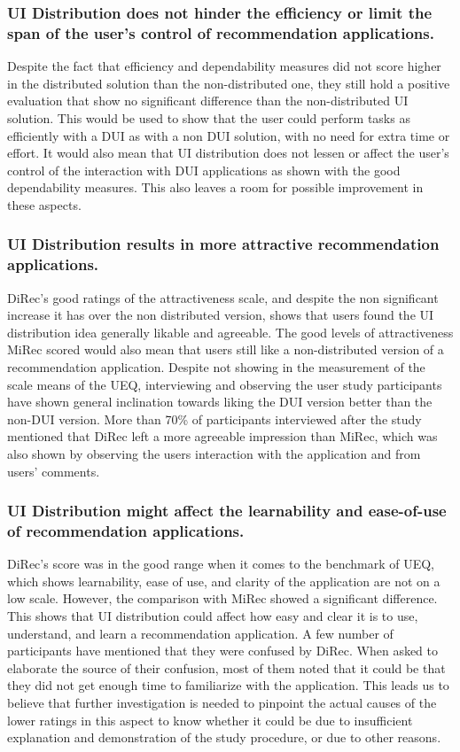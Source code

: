 \subsubsection{UI Distribution does not hinder the efficiency or limit the span
of the user's control of recommendation applications.} Despite the fact that
efficiency and dependability measures did not score higher in the distributed
solution than the non-distributed one, they still hold a positive
evaluation that show no significant difference than the non-distributed UI
solution. This would be used to show that the user could perform tasks as
efficiently with a DUI as with a non DUI solution, with no need for extra time
or effort. It would also mean that UI distribution does not lessen or affect the
user's control of the interaction with DUI applications as shown with the good
dependability measures. This also leaves a room for possible improvement in
these aspects.

\subsubsection{UI Distribution results in more attractive recommendation applications.} DiRec's good ratings of the attractiveness scale, and despite
the non significant increase it has over the non distributed version, shows that
users found the UI distribution idea generally likable and agreeable. The good
levels of attractiveness MiRec scored would also mean that users still like a
non-distributed version of a recommendation application. Despite not showing in
the measurement of the scale means of the UEQ, interviewing and observing the
user study participants have shown general inclination towards liking the DUI
version better than the non-DUI version. More than 70\% of participants 
interviewed after the study mentioned that DiRec left a more agreeable
impression than MiRec, which was also shown by observing the users interaction
with the application and from users' comments.

\subsubsection{UI Distribution might affect the learnability and ease-of-use of recommendation applications.}
DiRec's score was in the good range when it comes to the benchmark of UEQ, which
shows learnability, ease of use, and clarity of the application are not on a low
scale. However, the comparison with MiRec showed a significant difference. This
shows that UI distribution could affect how easy and clear it is to use,
understand, and learn a recommendation application. A few number of participants
have mentioned that they were confused by DiRec. When asked to elaborate the
source of their confusion, most of them noted that it could be that they did not
get enough time to familiarize with the application. This leads us to believe
that further investigation is needed to pinpoint the actual causes of the
lower ratings in this aspect to know whether it could be due to insufficient
explanation and demonstration of the study procedure, or due to other reasons.
